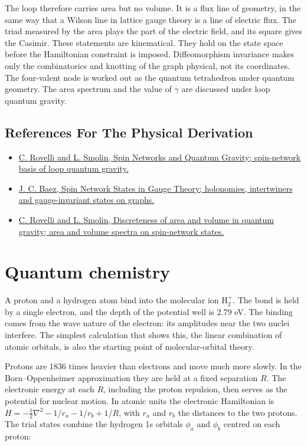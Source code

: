 \documentclass[11pt,oneside]{book}
\begin{document}
The loop therefore carries area but no volume. It is a flux line of geometry, in the same way that a Wilson line in lattice gauge theory is a line of electric flux. The triad measured by the area plays the part of the electric field, and its square gives the Casimir. These statements are kinematical. They hold on the state space before the Hamiltonian constraint is imposed. Diffeomorphism invariance makes only the combinatorics and knotting of the graph physical, not its coordinates. The four-valent node is worked out as the quantum tetrahedron under quantum geometry. The area spectrum and the value of \(\gamma\) are discussed under loop quantum gravity.

\subsection*{References For The Physical Derivation}
\begin{itemize}
\item \href{https://arxiv.org/abs/gr-qc/9505006}{C. Rovelli and L. Smolin, Spin Networks and Quantum Gravity; spin-network basis of loop quantum gravity.}
\item \href{https://arxiv.org/abs/gr-qc/9411007}{J. C. Baez, Spin Network States in Gauge Theory; holonomies, intertwiners and gauge-invariant states on graphs.}
\item \href{https://arxiv.org/abs/gr-qc/9411005}{C. Rovelli and L. Smolin, Discreteness of area and volume in quantum gravity; area and volume spectra on spin-network states.}
\end{itemize}





\clearpage

\section{Quantum chemistry}

\label{topic:quantum-chemistry}

A proton and a hydrogen atom bind into the molecular ion \(\mathrm H_2^+\). The bond is held by a single electron, and the depth of the potential well is 2.79 eV. The binding comes from the wave nature of the electron: its amplitudes near the two nuclei interfere. The simplest calculation that shows this, the linear combination of atomic orbitals, is also the starting point of molecular-orbital theory.

Protons are 1836 times heavier than electrons and move much more slowly. In the Born--Oppenheimer approximation they are held at a fixed separation \(R\). The electronic energy at each \(R\), including the proton repulsion, then serves as the potential for nuclear motion. In atomic units the electronic Hamiltonian is \(H=-\tfrac12\nabla^2-1/r_a-1/r_b+1/R\), with \(r_a\) and \(r_b\) the distances to the two protons. The trial states combine the hydrogen 1s orbitals \(\phi_a\) and \(\phi_b\) centred on each proton:
\end{document}
